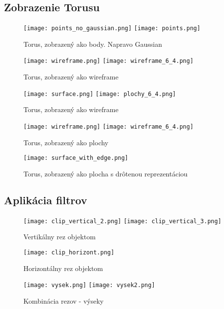 \documentclass[11pt, a4paper]{article}
\begin{document}
\subsection[]{Zobrazenie Torusu}
\begin{figure}[H]
    \texttt{[image: points\_no\_gaussian.png]}
    \texttt{[image: points.png]}
    \caption{Torus, zobrazený ako body. Napravo Gaussian}
\end{figure}
\begin{figure}[H]
    \texttt{[image: wireframe.png]}
    \texttt{[image: wireframe\_6\_4.png]}
    \caption{Torus, zobrazený ako wireframe}
\end{figure}
\begin{figure}[H]
    \texttt{[image: surface.png]}
    \texttt{[image: plochy\_6\_4.png]}
    \caption{Torus, zobrazený ako wireframe}
\end{figure}
\begin{figure}[H]
    \texttt{[image: wireframe.png]}
    \texttt{[image: wireframe\_6\_4.png]}
    \caption{Torus, zobrazený ako plochy}
\end{figure}
\begin{figure}[H]
    \centering
    \texttt{[image: surface\_with\_edge.png]}
    \caption{Torus, zobrazený ako plocha s drôtenou reprezentáciou}
\end{figure}
\subsection[]{Aplikácia filtrov}
\begin{figure}[H]
    \texttt{[image: clip\_vertical\_2.png]}
    \texttt{[image: clip\_vertical\_3.png]}
    \caption{Vertikálny rez objektom}
\end{figure}
\begin{figure}[H]
    \centering
    \texttt{[image: clip\_horizont.png]}
    \caption{Horizontálny rez objektom}
\end{figure}
\begin{figure}[H]
    \texttt{[image: vysek.png]}
    \texttt{[image: vysek2.png]}
    \caption{Kombinácia rezov - výseky}
\end{figure}

\newpage
\end{document}
